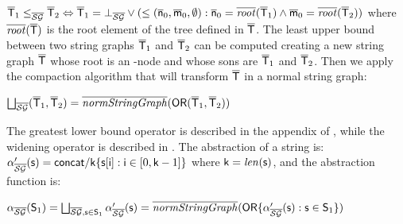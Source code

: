 \documentclass[orivec]{llncs}
\begin{document}
$\mathsf{\overline{T}}_1 \le_{\mathsf{\overline{\mathsf{\mathcal{SG}}}}} \mathsf{\overline{T}}_2 \Leftrightarrow \mathsf{\overline{T}}_1 = \bot_{\mathsf{\overline{\mathsf{\mathcal{SG}}}}} \lor (\le (\mathsf{\overline{n}}_0,\mathsf{\overline{m}}_0,\emptyset) : \mathsf{\overline{n}}_0 = \overline{\mathit{root}}(\mathsf{\overline{T}}_1) \land \mathsf{\overline{m}}_0 = \overline{\mathit{root}}(\mathsf{\overline{T}}_2))  
$
where $\overline{\mathit{root}}(\mathsf{\overline{T}})$ is the root element of the tree defined in $\mathsf{\overline{T}}$.
The least upper bound between two string graphs $\mathsf{\overline{T}}_1$ and $\mathsf{\overline{T}}_2$ can be computed creating a new string graph $\mathsf{\overline{T}}$ whose root is an -node and whose sons are $\mathsf{\overline{T}}_1$ and $\mathsf{\overline{T}}_2$. Then we apply the compaction algorithm that will transform $\mathsf{\overline{T}}$ in a normal string graph:
 
$\bigsqcup_{\mathsf{\overline{\mathsf{\mathcal{SG}}}}}(\mathsf{\overline{T}}_1,\mathsf{\overline{T}}_2) = \overline{\mathit{normStringGraph}}(\mathsf{OR}(\mathsf{\overline{T}}_1,\mathsf{\overline{T}}_2))$

The greatest lower bound operator is described in the appendix of \cite{JAN92}, while the widening operator is described in \cite{COR95}. The abstraction of a string is: $\alpha_{\mathsf{\overline{\mathsf{\mathcal{SG}}}}}^\prime(\mathsf{s}) = \mathsf{concat}/\mathsf{k} \{ \mathsf{s}[\mathsf{i}] : \mathsf{i} \in [0, \mathsf{k}-1]\}$ where $\mathsf{k} = \mathit{len}(\mathsf{s})$, and the abstraction function is:
 
$\alpha_{\mathsf{\overline{\mathsf{\mathcal{SG}}}}}(\mathsf{S}_1) = \bigsqcup_{\mathsf{\overline{\mathsf{\mathcal{SG}}}}, \mathsf{s} \in \mathsf{S}_1}{\alpha_{\mathsf{\overline{\mathsf{\mathcal{SG}}}}}^\prime(\mathsf{s})} = \overline{\mathit{normStringGraph}}(\mathsf{OR} \{ \alpha_{\mathsf{\overline{\mathsf{\mathcal{SG}}}}}^\prime(\mathsf{s}) : \mathsf{s} \in \mathsf{S}_1\})$
\end{document}
